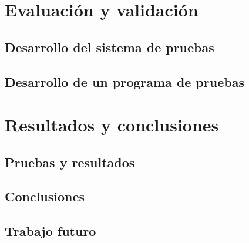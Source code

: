 \documentclass[11pt,a4paper,table]{beamer}
\begin{document}
	\section{Evaluación y validación}
		\subsection{Desarrollo del sistema de pruebas}
			
%			
%			
%			
		\subsection{Desarrollo de un programa de pruebas}
			
	\section{Resultados y conclusiones}
		\subsection{Pruebas y resultados}
			
		\subsection{Conclusiones}
			
		\subsection{Trabajo futuro}
						
%			
%			
%			
%				
%			
%			
%			
\end{document}
